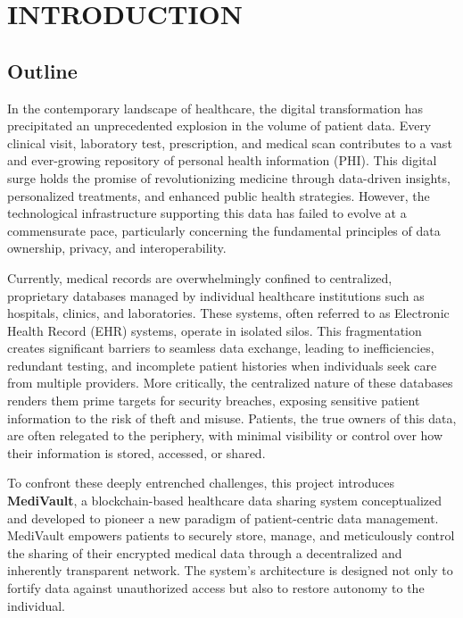 \chapter{INTRODUCTION}
\label{chap:introduction}

\section{Outline}
In the contemporary landscape of healthcare, the digital transformation has precipitated an unprecedented explosion in the volume of patient data. Every clinical visit, laboratory test, prescription, and medical scan contributes to a vast and ever-growing repository of personal health information (PHI). This digital surge holds the promise of revolutionizing medicine through data-driven insights, personalized treatments, and enhanced public health strategies. However, the technological infrastructure supporting this data has failed to evolve at a commensurate pace, particularly concerning the fundamental principles of data ownership, privacy, and interoperability.

Currently, medical records are overwhelmingly confined to centralized, proprietary databases managed by individual healthcare institutions such as hospitals, clinics, and laboratories. These systems, often referred to as Electronic Health Record (EHR) systems, operate in isolated silos. This fragmentation creates significant barriers to seamless data exchange, leading to inefficiencies, redundant testing, and incomplete patient histories when individuals seek care from multiple providers. More critically, the centralized nature of these databases renders them prime targets for security breaches, exposing sensitive patient information to the risk of theft and misuse. Patients, the true owners of this data, are often relegated to the periphery, with minimal visibility or control over how their information is stored, accessed, or shared.

To confront these deeply entrenched challenges, this project introduces \textbf{MediVault}, a blockchain-based healthcare data sharing system conceptualized and developed to pioneer a new paradigm of patient-centric data management. MediVault empowers patients to securely store, manage, and meticulously control the sharing of their encrypted medical data through a decentralized and inherently transparent network. The system's architecture is designed not only to fortify data against unauthorized access but also to restore autonomy to the individual.

